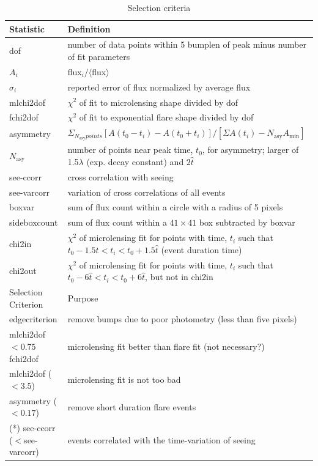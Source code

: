 \documentclass[iop, apj]{emulateapj}
\newcommand{\?}{\stackrel{?}{=}}
\begin{document}
\begin{table}[t]%
\label{tab:selecond}
    \caption{Selection criteria}
    \begin{center}
   \begin{tabular}{ll}
      \hline %
   \multicolumn{1}{l}{Statistic}&\multicolumn{1}{l}{Definition}\\
 \hline 
dof & number of data points within 5 bumplen of peak minus number of fit parameters\\
$A_i$ & flux$_i / \langle$flux$\rangle$\\
$\sigma_i$ & reported error of flux normalized by average flux\\
mlchi2dof & $\chi^2$ of fit to microlensing shape divided by dof \\
fchi2dof & $\chi^2$ of fit to exponential flare shape divided by dof \\ 
asymmetry & $\Sigma_{N_\mathrm{asy} points} [A(t_0-t_i)-A(t_0+t_i)]/[\Sigma A(t_i)-N_\mathrm{asy}A_\mathrm{min}]$\\
$N_\mathrm{asy}$ & number of points near peak time, $t_0$, for asymmetry; larger of 1.5$\lambda$ (exp. decay constant) and $2\hat t$\\
see-ccorr & cross correlation with seeing\\
see-varcorr & variation of cross correlations of all events\\
boxvar &  sum of flux count within a circle with a radius of 5 pixels \\
sideboxcount &  sum of flux count within a $41\times41$ box subtracted by boxvar\\
chi2in &  $\chi^2$ of microlensing fit for points with time, $t_i$ such that $t_0-1.5\hat t <t_i <t_0+1.5\hat t$ (event duration time)\\
chi2out &  $\chi^2$ of microlensing fit for points with time, $t_i$ such that $t_0-6\hat t <t_i <t_0+6\hat t$, but not in chi2in\\
  \hline
   \multicolumn{1}{l}{Selection Criterion}&\multicolumn{1}{l}{Purpose}\\
 \hline 
edgecriterion & remove bumps due to poor photometry (less than five pixels)\\
mlchi2dof$<0.75$ fchi2dof & microlensing fit better than flare fit (not necessary?)\\
mlchi2dof ($<3.5$) & microlensing fit is not too bad\\
asymmetry ($<0.17$) & remove short duration flare events\\
(*) see-ccorr ($<$see-varcorr) & events correlated with the time-variation of seeing\\

\end{tabular}
\end{center}
\end{table}
\end{document}
